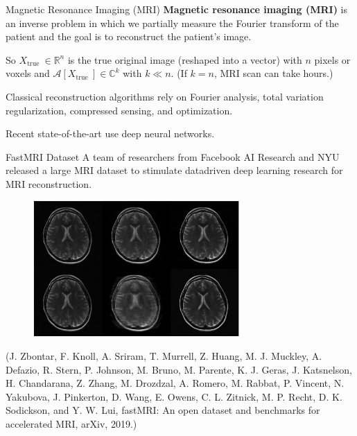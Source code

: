 \begin{frame}[allowframebreaks]

\begin{mydefinitionblock}{8.26}{Magnetic Resonance Imaging (MRI)}
    \textbf{Magnetic resonance imaging (MRI)} is an inverse problem in which we partially measure the Fourier transform of the patient and the goal is to reconstruct the patient's image.

    So $X_{\text {true }} \in \mathbb{R}^{n}$ is the true original image (reshaped into a vector) with $n$ pixels or voxels and $\mathcal{A}\left[X_{\text {true }}\right] \in \mathbb{C}^{k}$ with $k \ll n$. (If $k=n$, MRI scan can take hours.)

    Classical reconstruction algorithms rely on Fourier analysis, total variation regularization, compressed sensing, and optimization.

    Recent state-of-the-art use deep neural networks.
\end{mydefinitionblock}

\end{frame}

\begin{frame}[allowframebreaks]

\begin{mydefinitionblock}{8.27}{FastMRI Dataset}
    A team of researchers from Facebook AI Research and NYU released a large MRI dataset to stimulate datadriven deep learning research for MRI reconstruction.

    \begin{figure}[H]
        \centering
        \includegraphics[width=0.7\textwidth]{.././assets/8.26.jpg}
    \end{figure}

    (J. Zbontar, F. Knoll, A. Sriram, T. Murrell, Z. Huang, M. J. Muckley, A. Defazio, R. Stern, P. Johnson, M. Bruno, M. Parente, K. J. Geras, J. Katsnelson, H. Chandarana, Z. Zhang, M. Drozdzal, A. Romero, M. Rabbat, P. Vincent, N. Yakubova, J. Pinkerton, D. Wang, E. Owens, C. L. Zitnick, M. P. Recht, D. K. Sodickson, and Y. W. Lui, fastMRI: An open dataset and benchmarks for accelerated MRI, arXiv, 2019.)
\end{mydefinitionblock}

\end{frame}


